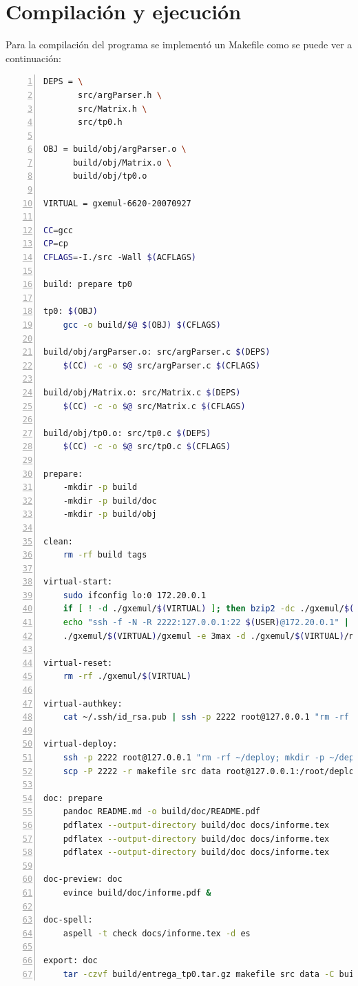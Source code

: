 \documentclass[a4paper,10pt]{article}
\begin{document}
\newpage


\section{Compilaci\'on y ejecuci\'on}

Para la compilaci\'on del programa se implement\'o un Makefile como se puede  ver a continuaci\'on:
\\
\begin{lstlisting}[numbers=left,language=bash]
DEPS = \
       src/argParser.h \
       src/Matrix.h \
       src/tp0.h

OBJ = build/obj/argParser.o \
      build/obj/Matrix.o \
      build/obj/tp0.o

VIRTUAL = gxemul-6620-20070927

CC=gcc
CP=cp
CFLAGS=-I./src -Wall $(ACFLAGS)

build: prepare tp0

tp0: $(OBJ)
	gcc -o build/$@ $(OBJ) $(CFLAGS)

build/obj/argParser.o: src/argParser.c $(DEPS)
	$(CC) -c -o $@ src/argParser.c $(CFLAGS)

build/obj/Matrix.o: src/Matrix.c $(DEPS)
	$(CC) -c -o $@ src/Matrix.c $(CFLAGS)
	
build/obj/tp0.o: src/tp0.c $(DEPS)
	$(CC) -c -o $@ src/tp0.c $(CFLAGS)

prepare:
	-mkdir -p build
	-mkdir -p build/doc
	-mkdir -p build/obj

clean:
	rm -rf build tags

virtual-start:
	sudo ifconfig lo:0 172.20.0.1
	if [ ! -d ./gxemul/$(VIRTUAL) ]; then bzip2 -dc ./gxemul/$(VIRTUAL).tar.bz2 | cpio --sparse -i -v; mv $(VIRTUAL) ./gxemul/ ; fi
	echo "ssh -f -N -R 2222:127.0.0.1:22 $(USER)@172.20.0.1" | xclip -sel clip
	./gxemul/$(VIRTUAL)/gxemul -e 3max -d ./gxemul/$(VIRTUAL)/netbsd-pmax.img

virtual-reset:
	rm -rf ./gxemul/$(VIRTUAL)

virtual-authkey:
	cat ~/.ssh/id_rsa.pub | ssh -p 2222 root@127.0.0.1 "rm -rf .ssh/authorized_keys; mkdir -p ~/.ssh; cat >> ~/.ssh/authorized_keys"

virtual-deploy:
	ssh -p 2222 root@127.0.0.1 "rm -rf ~/deploy; mkdir -p ~/deploy;"
	scp -P 2222 -r makefile src data root@127.0.0.1:/root/deploy

doc: prepare
	pandoc README.md -o build/doc/README.pdf
	pdflatex --output-directory build/doc docs/informe.tex
	pdflatex --output-directory build/doc docs/informe.tex
	pdflatex --output-directory build/doc docs/informe.tex

doc-preview: doc
	evince build/doc/informe.pdf &

doc-spell:
	aspell -t check docs/informe.tex -d es

export: doc
	tar -czvf build/entrega_tp0.tar.gz makefile src data -C build/doc/ informe.pdf README.pdf

\end{lstlisting}
\end{document}
